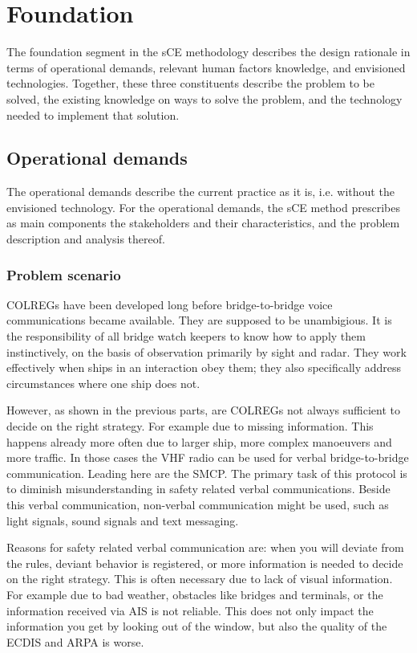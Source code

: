 \chapter{Foundation}
The foundation segment in the \ac{sCE} methodology describes the design rationale in terms of operational demands, relevant human factors knowledge, and envisioned technologies. Together, these three constituents describe the problem to be solved, the existing knowledge on ways to solve the problem, and the technology needed to implement that solution.

\section{Operational demands}
The operational demands describe the current practice as it is, i.e. without the envisioned technology. For the operational demands, the sCE method prescribes as main components the stakeholders and their characteristics, and the problem description and analysis thereof.

\subsection{Problem scenario}
\acf{COLREGs} have been developed long before bridge-to-bridge voice communications became available. They are supposed to be unambigious. It is the responsibility of all bridge watch keepers to know how to apply them instinctively, on the basis of observation primarily by sight and radar. They work effectively when ships in an interaction obey them; they also specifically address circumstances where one ship does not.

However, as shown in the previous parts, are \ac{COLREGs} not always sufficient to decide on the right strategy. For example due to missing information. This happens already more often due to larger ship, more complex manoeuvers and more traffic. In those cases the \ac{VHF} radio can be used for verbal bridge-to-bridge communication. Leading here are the \acf{SMCP}. The primary task of this protocol is to diminish misunderstanding in safety related verbal communications. 
Beside this verbal communication, non-verbal communication might be used, such as light signals, sound signals and text messaging.

Reasons for safety related verbal communication are: when you will deviate from the rules, deviant behavior is registered, or more information is needed to decide on the right strategy. This is often necessary due to lack of visual information. For example due to bad weather, obstacles like bridges and terminals, or the information received via \ac{AIS} is not reliable. This does not only impact the information you get by looking out of the window, but also the quality of the \ac{ECDIS} and \ac{ARPA} is worse.

